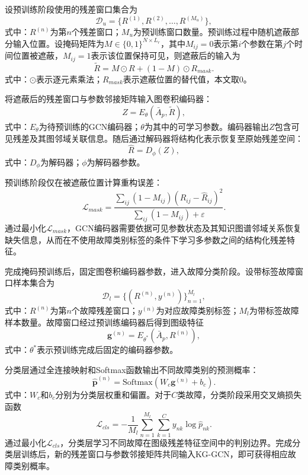 设预训练阶段使用的残差窗口集合为
\begin{equation}
\mathcal D_u=\{R^{(1)},R^{(2)},\ldots,R^{(M_u)}\},
\end{equation}
式中：$R^{(n)}$为第$n$个残差窗口；$M_u$为预训练窗口数量。预训练过程中随机遮蔽部分输入位置。设掩码矩阵为$M\in\{0,1\}^{N\times L_r}$，其中$M_{ij}=0$表示第$i$个参数在第$j$个时间位置被遮蔽，$M_{ij}=1$表示该位置保持可见，则遮蔽后的输入为
\begin{equation}
\tilde R=M\odot R+(1-M)\odot R_{mask}.
\end{equation}
式中：$\odot$表示逐元素乘法；$R_{mask}$表示遮蔽位置的替代值，本文取0。

将遮蔽后的残差窗口与参数邻接矩阵输入图卷积编码器：
\begin{equation}
Z=E_{\theta}(\bar A_p,\tilde R),
\end{equation}
式中：$E_{\theta}$为待预训练的GCN编码器；$\theta$为其中的可学习参数。编码器输出$Z$包含可见残差及其图邻域关联信息。随后通过解码器将结构化表示恢复至原始残差空间：
\begin{equation}
\hat R=D_{\phi}(Z),
\end{equation}
式中：$D_{\phi}$为解码器；$\phi$为解码器参数。

预训练阶段仅在被遮蔽位置计算重构误差：
\begin{equation}
\mathcal L_{mask}=\frac{\sum_{ij}(1-M_{ij})(R_{ij}-\hat R_{ij})^2}{\sum_{ij}(1-M_{ij})+\varepsilon}.
\end{equation}
通过最小化$\mathcal L_{mask}$，GCN编码器需要依据可见参数状态及其知识图谱邻域关系恢复缺失信息，从而在不使用故障类别标签的条件下学习多参数之间的结构化残差特征。

完成掩码预训练后，固定图卷积编码器参数，进入故障分类阶段。设带标签故障窗口样本集合为
\begin{equation}
\mathcal D_l=\{(R^{(n)},y^{(n)})\}_{n=1}^{M_l},
\end{equation}
式中：$R^{(n)}$为第$n$个故障残差窗口；$y^{(n)}$为对应故障类别标签；$M_l$为带标签故障样本数量。故障窗口经过预训练编码器后得到图级特征
\begin{equation}
\mathbf g^{(n)}=E_{\theta^*}(\bar A_p,R^{(n)}),
\end{equation}
式中：$\theta^*$表示预训练完成后固定的编码器参数。

分类层通过全连接映射和Softmax函数输出不同故障类别的预测概率：
\begin{equation}
\hat{\mathbf p}^{(n)}=\mathrm{Softmax}\left(W_c\mathbf g^{(n)}+b_c\right).
\end{equation}
式中：$W_c$和$b_c$分别为分类层权重和偏置。对于$C$类故障，分类阶段采用交叉熵损失函数
\begin{equation}
\mathcal L_{cls}=-\frac{1}{M_l}\sum_{n=1}^{M_l}\sum_{k=1}^{C}y_{nk}\log \hat p_{nk}.
\end{equation}
通过最小化$\mathcal L_{cls}$，分类层学习不同故障在图级残差特征空间中的判别边界。完成分类层训练后，新的残差窗口与参数邻接矩阵共同输入KG-GCN，即可获得相应故障类别概率。

